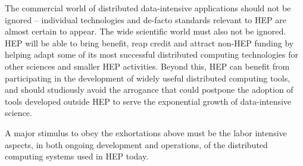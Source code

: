 The commercial world of distributed data-intensive applications should not be 
ignored -- individual technologies and de-facto standards relevant to HEP are 
almost certain to appear.  The wide scientific world must also not be ignored.  
HEP will be able to bring benefit, reap credit and attract non-HEP funding by 
helping adapt some of its most successful distributed computing technologies 
for other sciences and smaller HEP activities. Beyond this, HEP can benefit 
from participating in the development of widely useful distributed computing 
tools, and should studiously avoid the arrogance that could postpone the adoption 
of tools developed outside HEP to serve the exponential growth of data-intensive science.

A major stimulus to obey the exhortations above must be the labor intensive aspects, 
in both ongoing development and operations, of the distributed computing systems 
used in HEP today.

